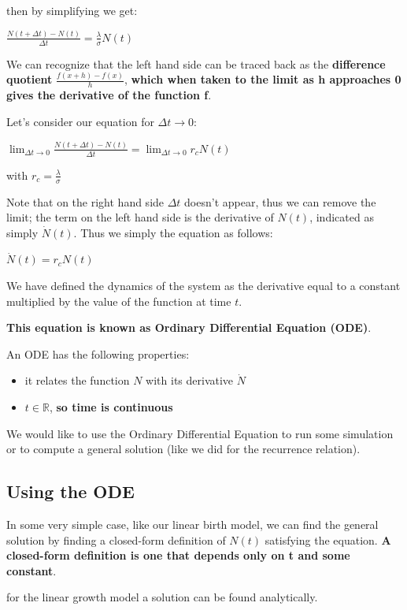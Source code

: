 then by simplifying we get:

\begin{center}
    $ \frac{N(t + \Delta{t}) - N(t)}{\Delta{t}} = \frac{\lambda}{\sigma}N(t) $
\end{center}

We can recognize that the left hand side can be traced back as the \textbf{difference quotient} $\frac{f(x + h) - f(x)}{h}$, \textbf{which when taken to the limit as h approaches 0 gives the derivative of the function f}.
\par Let's consider our equation for $\Delta{t} \rightarrow 0$:

\begin{center}
    $\lim_{\Delta{t} \to 0} \frac{N(t + \Delta{t}) - N(t)}{\Delta{t}} 
    = 
    \lim_{\Delta{t} \to 0} r_{c}N(t)$
\end{center}

with $r_{c} = \frac{\lambda}{\sigma}$

Note that on the right hand side $\Delta{t}$ doesn't appear, thus we can remove the limit; the term on the left hand side is the derivative of $N(t)$, indicated as simply $\dot{N}(t)$. Thus we simply the equation as follows:

\begin{center}
    $\dot{N}(t) = r_{c}N(t)$
\end{center}

We have defined the dynamics of the system as the derivative equal to a constant multiplied by the value of the function at time $t$.\par \textbf{This equation is known as Ordinary Differential Equation (ODE)}.
\par An ODE has the following properties:
\begin{itemize}
    \item it relates the function $N$ with its derivative $\dot{N}$

    \item $t \in \mathbb{R}$, \textbf{so time is continuous}
\end{itemize}

\par We would like to use the Ordinary Differential Equation to run some simulation or to compute a general solution (like we did for the recurrence relation). 

\subsection{Using the ODE}
In some very simple case, like our linear birth model, we can find the general solution by finding a closed-form definition of $N(t)$ satisfying the equation. \textbf{A closed-form definition is one that depends only on t and some constant}. 
\par for the linear growth model a solution can be found analytically. 

